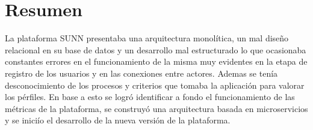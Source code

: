 \chapter*{Resumen}
La plataforma SUNN presentaba una arquitectura monolítica, un mal diseño relacional en su
base  de  datos  y  un  desarrollo  mal  estructurado  lo  que  ocasionaba  constantes  errores  en  el
funcionamiento de la misma muy evidentes en la etapa de registro de los usuarios y en las
conexiones entre actores.  Ademas se tenía desconocimiento de los procesos y criterios que
tomaba  la  aplicación  para  valorar  los  pérfiles.   En  base  a  esto  se  logró  identificar  a  fondo
el funcionamiento de las métricas de la plataforma, se construyó una arquitectura basada en
microservicios y se iniciío el desarrollo de la nueva versión de la plataforma.
